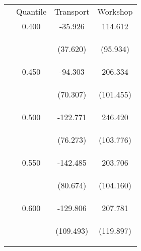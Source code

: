 \begin{tabular}{lccc}
\hline \noalign{\smallskip} & Quantile & Transport & Workshop\\
\noalign{\smallskip}\hline \noalign{\smallskip} & 0.400 & -35.926 & 114.612\\
 & \begin{footnotesize}\end{footnotesize} & \begin{footnotesize}(37.620)\end{footnotesize} & \begin{footnotesize}(95.934)\end{footnotesize}\\
\noalign{\smallskip} & 0.450 & -94.303 & 206.334\\
 & \begin{footnotesize}\end{footnotesize} & \begin{footnotesize}(70.307)\end{footnotesize} & \begin{footnotesize}(101.455)\end{footnotesize}\\
\noalign{\smallskip} & 0.500 & -122.771 & 246.420\\
 & \begin{footnotesize}\end{footnotesize} & \begin{footnotesize}(76.273)\end{footnotesize} & \begin{footnotesize}(103.776)\end{footnotesize}\\
\noalign{\smallskip} & 0.550 & -142.485 & 203.706\\
 & \begin{footnotesize}\end{footnotesize} & \begin{footnotesize}(80.674)\end{footnotesize} & \begin{footnotesize}(104.160)\end{footnotesize}\\
\noalign{\smallskip} & 0.600 & -129.806 & 207.781\\
 & \begin{footnotesize}\end{footnotesize} & \begin{footnotesize}(109.493)\end{footnotesize} & \begin{footnotesize}(119.897)\end{footnotesize}\\

\end{tabular}
